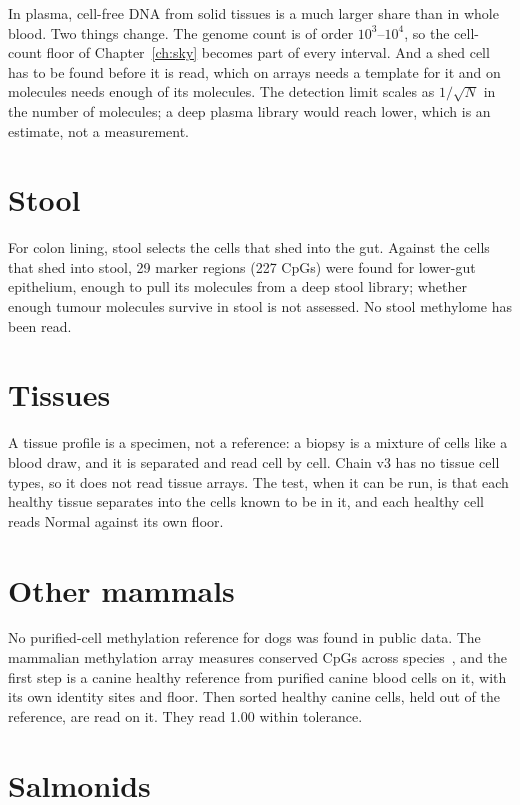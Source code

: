 In plasma, cell-free DNA from solid tissues is a much larger share than in whole blood. Two things change. The genome count is of order $10^3$--$10^4$, so the cell-count floor
of Chapter~\ref{ch:sky} becomes part of every interval. And a shed cell has to be found before it is read, which on arrays needs a template for it and on molecules needs
enough of its molecules. The detection limit scales as $1/\sqrt N$ in the number of molecules; a deep plasma library would reach lower, which is an
estimate, not a measurement. \calc


\section{Stool}

For colon lining, stool selects the cells that shed into the gut. Against the cells that shed into stool, 29 marker regions (227 CpGs) were found for lower-gut
epithelium, enough to pull its molecules from a deep stool library; whether enough tumour molecules survive in stool is not assessed. \measured{} No stool methylome has been read. \openprob

\section{Tissues}

A tissue profile is a specimen, not a reference: a biopsy is a mixture of cells like a blood draw, and it is separated and read cell by cell.
Chain v3 has no tissue cell types, so it does not read tissue arrays. \openprob{} The test, when it can be run, is that each healthy tissue separates into the cells known
to be in it, and each healthy cell reads Normal against its own floor.

\section{Other mammals}

No purified-cell methylation reference for dogs was found in public data. \observed{} The mammalian methylation array measures conserved CpGs across species~\cite{Arneson2022}, and the first step is
a canine healthy reference from purified canine blood cells on it, with its own identity sites and floor. Then sorted healthy canine cells, held out of the reference, are
read on it. \prediction{} They read 1.00 within tolerance.

\section{Salmonids}

